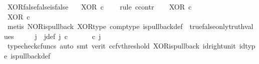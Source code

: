 \begin{isabellebody}
\isamarkupfalse%
%
\endisatagproof
{\isafoldproof}%
%
\isadelimproof
\isanewline
%
\endisadelimproof
\isanewline
{}\isamarkupfalse%
\ XOR{\isacharunderscore}{\kern0pt}false{\isacharunderscore}{\kern0pt}false{\isacharunderscore}{\kern0pt}is{\isacharunderscore}{\kern0pt}false{\isacharcolon}{\kern0pt}\isanewline
\ \ \ {\isachardoublequoteopen}XOR\ {\isasymcirc}\isactrlsub c\ \ {\isasymlangle}{\isasymf}{\isacharcomma}{\kern0pt}{\isasymf}{\isasymrangle}\ {\isacharequal}{\kern0pt}\ {\isasymf}{\isachardoublequoteclose}\isanewline
%
\isadelimproof
%
\endisadelimproof
%
\isatagproof
{}\isamarkupfalse%
{\isacharparenleft}{\kern0pt}rule\ ccontr{\isacharparenright}{\kern0pt}\isanewline
\ \ \isamarkupfalse%
\ {\isachardoublequoteopen}XOR\ {\isasymcirc}\isactrlsub c\ {\isasymlangle}{\isasymf}{\isacharcomma}{\kern0pt}{\isasymf}{\isasymrangle}\ {\isasymnoteq}\ {\isasymf}{\isachardoublequoteclose}\isanewline
\ \ \isamarkupfalse%
\ \isamarkupfalse%
\ {\isachardoublequoteopen}XOR\ {\isasymcirc}\isactrlsub c\ {\isasymlangle}{\isasymf}{\isacharcomma}{\kern0pt}{\isasymf}{\isasymrangle}\ \ {\isacharequal}{\kern0pt}\ {\isasymt}{\isachardoublequoteclose}\isanewline
\ \ \ \ \isamarkupfalse%
\ {\isacharparenleft}{\kern0pt}metis\ NOR{\isacharunderscore}{\kern0pt}is{\isacharunderscore}{\kern0pt}pullback\ XOR{\isacharunderscore}{\kern0pt}type\ comp{\isacharunderscore}{\kern0pt}type\ is{\isacharunderscore}{\kern0pt}pullback{\isacharunderscore}{\kern0pt}def\ \ true{\isacharunderscore}{\kern0pt}false{\isacharunderscore}{\kern0pt}only{\isacharunderscore}{\kern0pt}truth{\isacharunderscore}{\kern0pt}values{\isacharparenright}{\kern0pt}\isanewline
\ \ \isamarkupfalse%
\ \isamarkupfalse%
\ j\ \ j{\isacharunderscore}{\kern0pt}def{\isacharcolon}{\kern0pt}\ {\isachardoublequoteopen}j\ {\isasymin}\isactrlsub c\ {\isasymone}{\isasymCoprod}{\isasymone}\ {\isasymand}\ {\isacharparenleft}{\kern0pt}{\isasymlangle}{\isasymt}{\isacharcomma}{\kern0pt}\ {\isasymf}{\isasymrangle}\ {\isasymamalg}{\isasymlangle}{\isasymf}{\isacharcomma}{\kern0pt}\ {\isasymt}{\isasymrangle}{\isacharparenright}{\kern0pt}\ {\isasymcirc}\isactrlsub c\ j\ \ {\isacharequal}{\kern0pt}\ {\isasymlangle}{\isasymf}{\isacharcomma}{\kern0pt}{\isasymf}{\isasymrangle}{\isachardoublequoteclose}\isanewline
\ \ \ \ \isamarkupfalse%
\ {\isacharparenleft}{\kern0pt}typecheck{\isacharunderscore}{\kern0pt}cfuncs{\isacharcomma}{\kern0pt}\ auto{\isacharcomma}{\kern0pt}\ smt\ {\isacharparenleft}{\kern0pt}verit{\isacharcomma}{\kern0pt}\ ccfv{\isacharunderscore}{\kern0pt}threshold{\isacharparenright}{\kern0pt}\ XOR{\isacharunderscore}{\kern0pt}is{\isacharunderscore}{\kern0pt}pullback\ id{\isacharunderscore}{\kern0pt}right{\isacharunderscore}{\kern0pt}unit{}\ id{\isacharunderscore}{\kern0pt}type\ is{\isacharunderscore}{\kern0pt}pullback{\isacharunderscore}{\kern0pt}def{\isacharparenright}{\kern0pt}\isanewline

\end{isabellebody}
